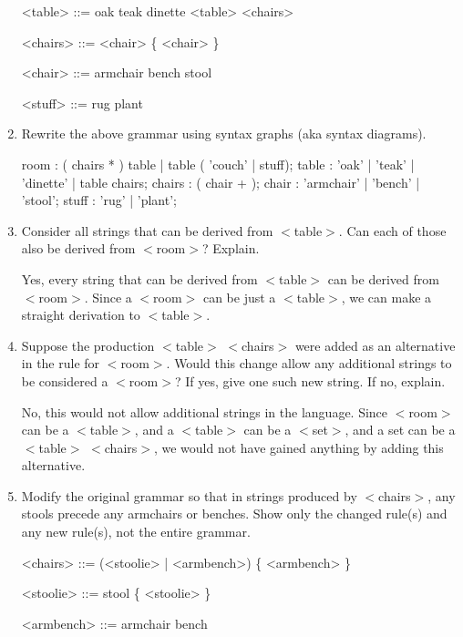 \documentclass[12pt,letterpaper]{article}
\begin{document}
\begin{enumerate}
\begin{grammar}
        <table> ::= oak
                \alt teak
                \alt dinette
                \alt <table> <chairs>

        <chairs> ::= <chair> \{ <chair> \}

        <chair> ::= armchair
                \alt bench
                \alt stool

        <stuff> ::= rug
                \alt plant
      \end{grammar}

    \item Rewrite the above grammar using syntax graphs (aka syntax diagrams).
      \begin{rail}
        room : ( chairs * ) table | table ( 'couch' | stuff);
        table : 'oak' | 'teak' | 'dinette' | table chairs;
        chairs : ( chair + );
        chair : 'armchair' | 'bench' | 'stool';
        stuff : 'rug' | 'plant';
      \end{rail}

    \item
      Consider all strings that can be derived from $<$table$>$.
      Can each of those also be derived from $<$room$>$?
      Explain.

      Yes, every string that can be derived from $<$table$>$
      can be derived from $<$room$>$.
      Since a $<$room$>$ can be just a $<$table$>$,
      we can make a straight derivation to $<$table$>$.

    \item
      Suppose the production $<$table$>$ $<$chairs$>$ were added as an alternative in the rule for $<$room$>$.
      Would this change allow any additional strings to be considered a $<$room$>$?
      If yes, give one such new string.
      If no, explain.

      No, this would not allow additional strings in the language.
      Since $<$room$>$ can be a $<$table$>$, and a $<$table$>$ can be a $<$set$>$, and a set can be a $<$table$>$ $<$chairs$>$,
      we would not have gained anything by adding this alternative.

    \item
      Modify the original grammar so that in strings produced by $<$chairs$>$,
      any stools precede any armchairs or benches.
      Show only the changed rule(s) and any new rule(s),
      not the entire grammar.

      \begin{grammar}
        <chairs> ::=  (<stoolie> | <armbench>) \{ <armbench> \}

        <stoolie> ::= stool \{ <stoolie> \}

        <armbench> ::=  armchair
                   \alt bench
      \end{grammar}
  \end{enumerate}
\end{document}
